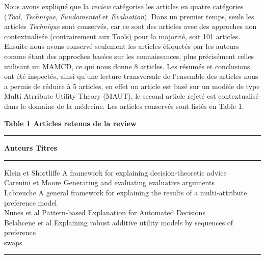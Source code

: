 \documentclass[a4paper, 11pt]{article}
\renewcommand{\textbf}[1]{\begingroup\bfseries\mathversion{bold}#1\endgroup}
\begin{document}
Nous avons expliqué que la \textit{review} catégorise les articles en quatre catégories (\textit{Tool}, \textit{Technique}, \textit{Fundamental} et \textit{Evaluation}).
Dans un premier temps, seuls les articles \textit{Technique} sont conservés, car ce sont des articles avec des approches non contextualisée (contrairement aux Tools) pour la majorité, soit 101 articles. Ensuite nous avons conservé seulement les articles étiquetés par les auteurs comme étant des approches basées sur les connaissances, plus précisément celles utilisant un MAMCD, ce qui nous donne 8 articles. Les résumés et conclusions ont été inspectés, ainsi qu'une lecture transversale de l'ensemble  des articles nous a permis de réduire à 5 articles, en effet un article \textcolor{blue}{\citep{BIELZA2000725}} est basé sur un modèle de type Multi Atrribute Utility Theory (MAUT), le second article rejeté est contextualisé dans le domaine de la médecine\textcolor{blue}{\citep{BOHANEC2000191}}. Les articles conservés sont listés en Table 1.
\vspace{.3cm}


\noindent \textbf{Table 1} Articles retenus de la review
\begin{center}
\begin{minipage}{.95\textwidth}
\hrule \vspace{.2cm}
\noindent	\textbf{Auteurs} \hspace*{2cm}\textbf{Titres}
\vspace{.2cm}    
\hrule \vspace{.2cm}
Klein et Shortliffe \hspace*{.47cm} A framework for explaining decision-theoretic advice \\
Carenini et Moore  \hspace*{.4cm} Generating and evaluating evaluative arguments \\
Labreuche \hspace*{1.75cm} A general framework for explaining the results of a multi-attribute\\
\hspace*{3.6cm} preference model \\
Nunes et al   \hspace*{1.55cm}    Pattern-based Explanation for Automated Decisions    \\
Belahcene et al \hspace*{.9cm}  Explaining robust additive utility models by sequences of preference\\
\hspace*{3.6cm} swaps 
\vspace{.2cm}
\hrule
\end{minipage}
\end{center}
\end{document}
